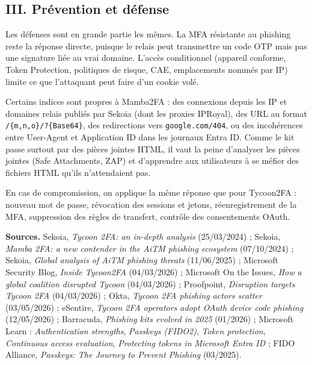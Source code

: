 \documentclass[10pt,a4paper]{article}
\begin{document}
\subsection{III. Prévention et défense}
Les défenses sont en grande partie les mêmes. La MFA résistante au phishing reste la réponse directe, puisque le relais peut transmettre un code OTP mais pas une signature liée au vrai domaine. L'accès conditionnel (appareil conforme, Token Protection, politiques de risque, CAE, emplacements nommés par IP) limite ce que l'attaquant peut faire d'un cookie volé.

Certains indices sont propres à Mamba2FA : des connexions depuis les IP et domaines relais publiés par Sekoia (dont les proxies IPRoyal), des URL au format \texttt{/\{m,n,o\}/?\{Base64\}}, des redirections vers \texttt{google.com/404}, ou des incohérences entre User-Agent et Application ID dans les journaux Entra ID. Comme le kit passe surtout par des pièces jointes HTML, il vaut la peine d'analyser les pièces jointes (Safe Attachments, ZAP) et d'apprendre aux utilisateurs à se méfier des fichiers HTML qu'ils n'attendaient pas.

En cas de compromission, on applique la même réponse que pour Tycoon2FA : nouveau mot de passe, révocation des sessions et jetons, réenregistrement de la MFA, suppression des règles de transfert, contrôle des consentements OAuth.

\vfill
{\footnotesize
\textbf{Sources.}
Sekoia, \emph{Tycoon 2FA: an in-depth analysis} (25/03/2024) ;
Sekoia, \emph{Mamba 2FA: a new contender in the AiTM phishing ecosystem} (07/10/2024) ;
Sekoia, \emph{Global analysis of AiTM phishing threats} (11/06/2025) ;
Microsoft Security Blog, \emph{Inside Tycoon2FA} (04/03/2026) ;
Microsoft On the Issues, \emph{How a global coalition disrupted Tycoon} (04/03/2026) ;
Proofpoint, \emph{Disruption targets Tycoon 2FA} (04/03/2026) ;
Okta, \emph{Tycoon 2FA phishing actors scatter} (03/05/2026) ;
eSentire, \emph{Tycoon 2FA operators adopt OAuth device code phishing} (12/05/2026) ;
Barracuda, \emph{Phishing kits evolved in 2025} (01/2026) ;
Microsoft Learn : \emph{Authentication strengths}, \emph{Passkeys (FIDO2)}, \emph{Token protection}, \emph{Continuous access evaluation}, \emph{Protecting tokens in Microsoft Entra ID} ;
FIDO Alliance, \emph{Passkeys: The Journey to Prevent Phishing} (03/2025).
}
\end{document}
